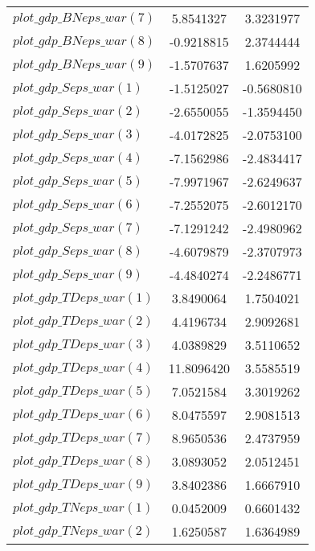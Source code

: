 \begin{center}
\begin{longtable}{lcc}
$plot\_gdp\_BN eps\_war (7)  $	 & 	      5.8541327	 & 	      3.3231977 \\ 
$plot\_gdp\_BN eps\_war (8)  $	 & 	     -0.9218815	 & 	      2.3744444 \\ 
$plot\_gdp\_BN eps\_war (9)  $	 & 	     -1.5707637	 & 	      1.6205992 \\ 
$plot\_gdp\_S eps\_war (1)   $	 & 	     -1.5125027	 & 	     -0.5680810 \\ 
$plot\_gdp\_S eps\_war (2)   $	 & 	     -2.6550055	 & 	     -1.3594450 \\ 
$plot\_gdp\_S eps\_war (3)   $	 & 	     -4.0172825	 & 	     -2.0753100 \\ 
$plot\_gdp\_S eps\_war (4)   $	 & 	     -7.1562986	 & 	     -2.4834417 \\ 
$plot\_gdp\_S eps\_war (5)   $	 & 	     -7.9971967	 & 	     -2.6249637 \\ 
$plot\_gdp\_S eps\_war (6)   $	 & 	     -7.2552075	 & 	     -2.6012170 \\ 
$plot\_gdp\_S eps\_war (7)   $	 & 	     -7.1291242	 & 	     -2.4980962 \\ 
$plot\_gdp\_S eps\_war (8)   $	 & 	     -4.6079879	 & 	     -2.3707973 \\ 
$plot\_gdp\_S eps\_war (9)   $	 & 	     -4.4840274	 & 	     -2.2486771 \\ 
$plot\_gdp\_TD eps\_war (1)  $	 & 	      3.8490064	 & 	      1.7504021 \\ 
$plot\_gdp\_TD eps\_war (2)  $	 & 	      4.4196734	 & 	      2.9092681 \\ 
$plot\_gdp\_TD eps\_war (3)  $	 & 	      4.0389829	 & 	      3.5110652 \\ 
$plot\_gdp\_TD eps\_war (4)  $	 & 	     11.8096420	 & 	      3.5585519 \\ 
$plot\_gdp\_TD eps\_war (5)  $	 & 	      7.0521584	 & 	      3.3019262 \\ 
$plot\_gdp\_TD eps\_war (6)  $	 & 	      8.0475597	 & 	      2.9081513 \\ 
$plot\_gdp\_TD eps\_war (7)  $	 & 	      8.9650536	 & 	      2.4737959 \\ 
$plot\_gdp\_TD eps\_war (8)  $	 & 	      3.0893052	 & 	      2.0512451 \\ 
$plot\_gdp\_TD eps\_war (9)  $	 & 	      3.8402386	 & 	      1.6667910 \\ 
$plot\_gdp\_TN eps\_war (1)  $	 & 	      0.0452009	 & 	      0.6601432 \\ 
$plot\_gdp\_TN eps\_war (2)  $	 & 	      1.6250587	 & 	      1.6364989 \\ 

\end{longtable}
\end{center}
